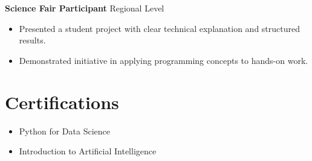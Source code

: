 \documentclass[11pt]{article}
\begin{document}
\textbf{Science Fair Participant} \hfill Regional Level
\begin{itemize}
\item Presented a student project with clear technical explanation and structured results.
\item Demonstrated initiative in applying programming concepts to hands-on work.
\end{itemize}

\section*{Certifications}
\begin{itemize}
\item Python for Data Science
\item Introduction to Artificial Intelligence
\end{itemize}
\end{document}
